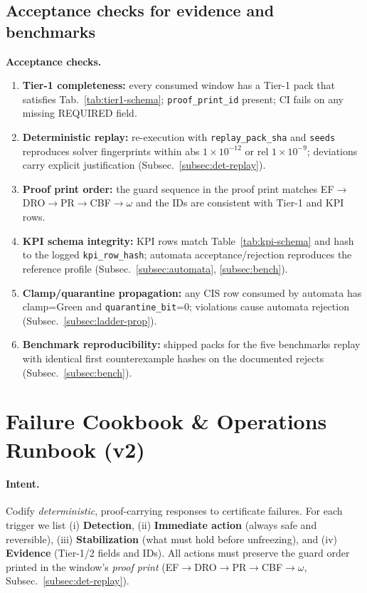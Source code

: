 \documentclass[10pt]{article}
\newenvironment{acceptchecks}{\par\medskip\noindent\textbf{Acceptance checks.}\begin{enumerate}[leftmargin=*]}{\end{enumerate}\medskip}
\newenvironment{acceptchecks}{\begin{mdframed}\textbf{Acceptance checks.}\begin{enumerate}[leftmargin=*]}{\end{enumerate}\end{mdframed}}
\begin{document}
\subsection{Acceptance checks for evidence and benchmarks}\label{subsec:pcc-accept}
\begin{acceptchecks}
\item \textbf{Tier-1 completeness:} every consumed window has a Tier-1 pack that satisfies Tab.~\ref{tab:tier1-schema}; \texttt{proof\_print\_id} present; CI fails on any missing REQUIRED field.
\item \textbf{Deterministic replay:} re-execution with \texttt{replay\_pack\_sha} and \texttt{seeds} reproduces solver fingerprints within abs \(1\!\times\!10^{-12}\) or rel \(1\!\times\!10^{-9}\); deviations carry explicit justification (Subsec.~\ref{subsec:det-replay}).
\item \textbf{Proof print order:} the guard sequence in the proof print matches EF$\rightarrow$DRO$\rightarrow$PR$\rightarrow$CBF$\rightarrow\omega$ and the IDs are consistent with Tier-1 and KPI rows.
\item \textbf{KPI schema integrity:} KPI rows match Table~\ref{tab:kpi-schema} and hash to the logged \texttt{kpi\_row\_hash}; automata acceptance/rejection reproduces the reference profile (Subsec.~\ref{subsec:automata}, \ref{subsec:bench}).
\item \textbf{Clamp/quarantine propagation:} any CIS row consumed by automata has clamp=Green and \texttt{quarantine\_bit}=0; violations cause automata rejection (Subsec.~\ref{subsec:ladder-prop}).
\item \textbf{Benchmark reproducibility:} shipped packs for the five benchmarks replay with identical first counterexample hashes on the documented rejects (Subsec.~\ref{subsec:bench}).
\end{acceptchecks}


\section{Failure Cookbook \& Operations Runbook (v2)}\label{sec:runbook-v2}

\paragraph{Intent.}
Codify \emph{deterministic}, proof-carrying responses to certificate failures. For each trigger we list (i) \textbf{Detection}, (ii) \textbf{Immediate action} (always safe and reversible), (iii) \textbf{Stabilization} (what must hold before unfreezing), and (iv) \textbf{Evidence} (Tier-1/2 fields and IDs). All actions must preserve the guard order printed in the window’s \emph{proof print} (EF$\rightarrow$DRO$\rightarrow$PR$\rightarrow$CBF$\rightarrow\omega$, Subsec.~\ref{subsec:det-replay}).
\end{document}
